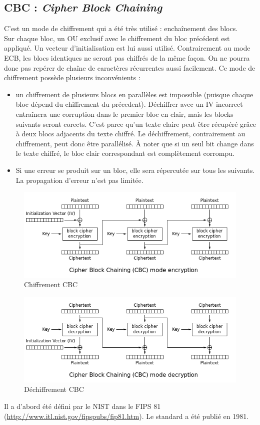 \subsection{CBC : \textit{Cipher Block Chaining}}
C'est un mode de chiffrement qui a été très utilisé : enchaînement des blocs.\\
Sur chaque bloc, un OU exclusif avec le chiffrement du bloc précédent est appliqué. Un vecteur d'initialisation est lui aussi utilisé. Contrairement au mode ECB, les blocs identiques ne seront pas chiffrés de la même façon. On ne pourra donc pas repérer de chaîne de caractères récurrentes aussi facilement. Ce mode de chiffrement possède plusieurs inconvénients : 
\begin{itemize}
	\item un chiffrement de plusieurs blocs en parallèles est impossible (puisque chaque bloc dépend du chiffrement du précedent). Déchiffrer avec un IV incorrect entraînera une corruption dans le premier bloc en clair, mais les blocks suivants seront corects. C'est parce qu'un texte claire peut être récupéré grâce à deux blocs adjacents du texte chiffré. Le déchiffrement, contrairement au chiffrement, peut donc être parallélisé. À noter que si un seul bit change dans le texte chiffré, le bloc clair correspondant est complètement corrompu.
	\item Si une erreur se produit sur un bloc, elle sera répercutée sur tous les suivants. La propagation d'erreur n'est pas limitée.
\end{itemize} 
\begin{figure}[H]
	\centering
	\includegraphics[width=13cm]{images/CBC_chiff.png}
	\caption{Chiffrement CBC}
	\label{CBC_chiff}
\end{figure}

\begin{figure}[H]
	\centering
	\includegraphics[width=13cm]{images/CBC_dechiff.png}
	\caption{Déchiffrement CBC}
	\label{CBC_dechiff}
\end{figure}

Il a d'abord été défini par le NIST dans le FIPS 81 (\url{http://www.itl.nist.gov/fipspubs/fip81.htm}). Le standard a été publié en 1981.
